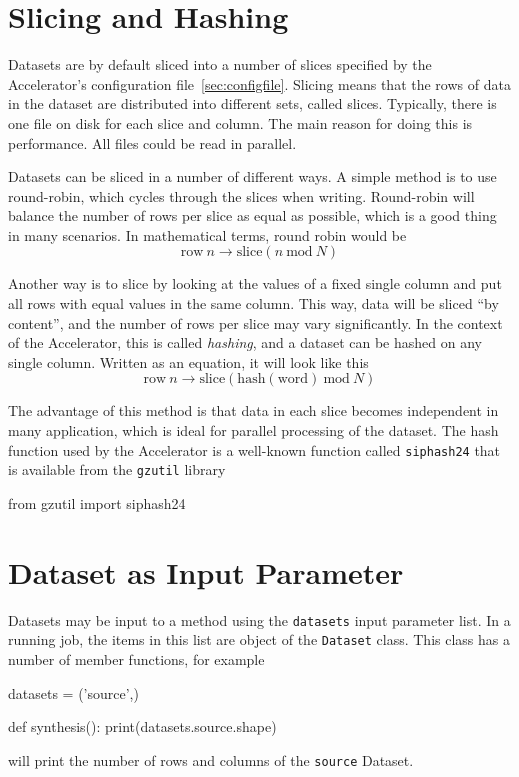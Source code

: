 \section{Slicing and Hashing}
\label{sec:slicing_and_hashing}

Datasets are by default sliced into a number of slices specified by
the Accelerator's configuration file~\ref{sec:configfile}.  Slicing means that the
rows of data in the dataset are distributed into different sets,
called slices.  Typically, there is one file on disk for each slice
and column.  The main reason for doing this is performance.  All files
could be read in parallel.

Datasets can be sliced in a number of different ways.  A simple method
is to use round-robin, which cycles through the slices when writing.
Round-robin will balance the number of rows per slice as equal as
possible, which is a good thing in many scenarios.  In mathematical
terms, round robin would be
\begin{equation}
  \textrm{row}~n \longrightarrow \textrm{slice}(n~\textrm{mod}~N)
\end{equation}

Another way is to slice by looking at the values of a fixed single
column and put all rows with equal values in the same column.  This
way, data will be sliced ``by content'', and the number of rows per
slice may vary significantly.  In the context of the Accelerator, this
is called \emph{hashing}, and a dataset can be hashed on any single
column.  Written as an equation, it will look like this
\begin{equation}
\textrm{row}~n \longrightarrow \textrm{slice}(\textrm{hash}(\textrm{word})~\textrm{mod}~N)
\end{equation}

The advantage of this method is that data in each slice becomes
independent in many application, which is ideal for parallel
processing of the dataset.  The hash function used by the Accelerator
is a well-known function called \texttt{siphash24} that is available
from the \texttt{gzutil} library
\begin{python}
from gzutil import siphash24
\end{python}



\section{Dataset as Input Parameter}
Datasets may be input to a method using the \texttt{datasets} input
parameter list.  In a running job, the items in this list are object
of the \texttt{Dataset} class.  This class has a number of member
functions, for example
\begin{python}
datasets = ('source',)

def synthesis():
  print(datasets.source.shape)
\end{python}
will print the number of rows and columns of the \texttt{source}
Dataset.


